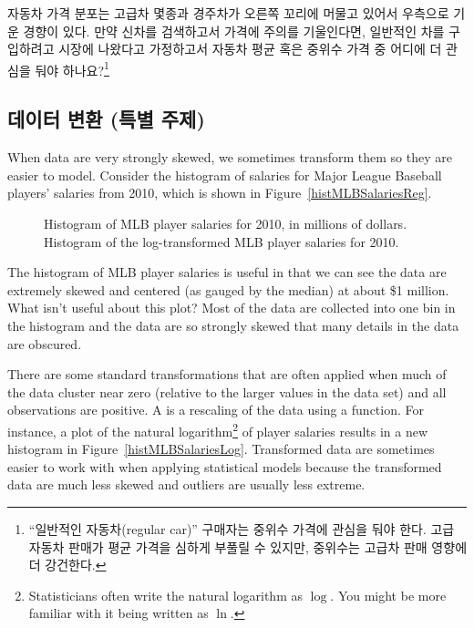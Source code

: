\begin{exercise}
자동차 가격 분포는 고급차 몇종과 경주차가 오른쪽 꼬리에 머물고 있어서 우측으로 기운 경향이 있다. 
만약 신차를 검색하고서 가격에 주의를 기울인다면, 일반적인 차를 구입하려고 시장에 나왔다고 가정하고서 자동차 평균 혹은 중위수 가격 중 어디에 더 관심을 둬야 하나요?\footnote{``일반적인 자동차(regular car)'' 구매자는 중위수 가격에 관심을 둬야 한다.
고급 자동차 판매가 평균 가격을 심하게 부풀릴 수 있지만, 중위수는 고급차 판매 영향에 더 강건한다.}
\end{exercise}

\subsection{데이터 변환 (특별 주제)}
\label{transformingDataSubsection}

When data are very strongly skewed, we sometimes transform them so they are easier to model. Consider the histogram of salaries for Major League Baseball players' salaries from 2010, which is shown in Figure~\ref{histMLBSalariesReg}.

\begin{figure}[ht]
\centering
{}
\caption{ Histogram of MLB player salaries for 2010, in millions of dollars.  Histogram of the log-transformed MLB player salaries for 2010.}
\label{histMLBSalaries}
\end{figure}

\begin{example}{The histogram of MLB player salaries is useful in that we can see the data are extremely skewed and centered (as gauged by the median) at about \$1 million. What isn't useful about this plot?}
Most of the data are collected into one bin in the histogram and the data are so strongly skewed that many details in the data are obscured.
\end{example}

There are some standard transformations that are often applied when much of the data cluster near zero (relative to the larger values in the data set) and all observations are positive. A  is a rescaling of the data using a function. For instance, a plot of the natural logarithm\footnote{Statisticians often write the natural logarithm as $\log$. You might be more familiar with it being written as $\ln$.} of player salaries results in a new histogram in Figure~\ref{histMLBSalariesLog}. Transformed data are sometimes easier to work with when applying statistical models because the transformed data are much less skewed and outliers are usually less extreme.

